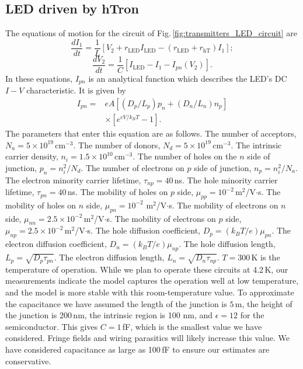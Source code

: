 \documentclass[aip,amsmath,amssymb,reprint,nofootinbib]{revtex4-1}
\begin{document}
\subsection{LED driven by hTron}
The equations of motion for the circuit of Fig.\,\ref{fig:transmitters_LED_circuit} are
\begin{equation}
\label{eq:ledDrivenByHTron_equationOfMotion01}
\frac{dI_1}{dt} = \frac{1}{L}\left[V_2+r_{\mathrm{LED}}I_{\mathrm{LED}}-(r_{\mathrm{LED}}+r_{\mathrm{hT}})I_1\right];
\end{equation}
\begin{equation}
\label{eq:ledDrivenByHTron_equationOfMotion02}
\frac{dV_2}{dt} = \frac{1}{C}[I_{\mathrm{LED}}-I_1-I_{pn}(V_2)].
\end{equation} 
In these equations, $I_{pn}$ is an analytical function which describes the LED's DC $I-V$ characteristic. It is given by \cite{stba2006}
\begin{equation}
\label{eq:ledDrivenByHTron_ledModel}
\begin{split}
I_{pn} = & eA\left[ (D_p/L_p)p_n + (D_n/L_n)n_p \right] \\
& \times\left[ e^{eV/k_BT} - 1 \right].
\end{split}
\end{equation}
The parameters that enter this equation are as follows. The number of acceptors, $N_a = 5\times 10^{19}$\,cm$^{-3}$. The number of donors, $N_d = 5\times 10^{19}$\,cm$^{-3}$. The intrinsic carrier density, $n_i = 1.5\times 10^{10}$\,cm$^{-3}$. The number of holes on the $n$ side of junction, $p_n = n_i^2/N_d$. The number of electrons on $p$ side of junction, $n_p = n_i^2/N_a$. The electron minority carrier lifetime, $\tau_{np} = 40$\,ns. The hole minority carrier lifetime, $\tau_{pn} = 40$\,ns. The mobility of holes on $p$ side, $\mu_{pp} = 10^{-2}$\,m$^2$/V$\cdot$s. The mobility of holes on $n$ side, $\mu_{pn}= 10^{-2}$ m$^2$/V$\cdot$s. The mobility of electrons on $n$ side, $\mu_{nn} =  2.5\times10^{-2}$\,m$^2$/V$\cdot$s. The mobility of electrons on $p$ side, $\mu_{np} = 2.5\times 10^{-2}$\,m$^2$/V$\cdot$s. The hole diffusion coefficient, $D_p = (k_BT/e)\mu_{pn}$. The electron diffusion coefficient, $D_n = (k_BT/e)\mu_{np}$. The hole diffusion length, $L_p = \sqrt{D_p\tau_{pn}}$. The electron diffusion length, $L_n = \sqrt{D_n\tau_{np}}$. $T = 300$\,K is the temperature of operation. While we plan to operate these circuits at 4.2\,K, our measurements indicate the model captures the operation well at low temperature, and the model is more stable with this room-temperature value. To approximate the capacitance we have assumed the length of the junction is $5$\,\textmu m, the height of the junction is 200\,nm, the intrinsic region is 100 nm, and $\epsilon = 12$ for the semiconductor. This gives $C = 1$\,fF, which is the smallest value we have considered. Fringe fields and wiring parasitics will likely increase this value. We have considered capacitance as large as 100\,fF to ensure our estimates are conservative.
\end{document}

